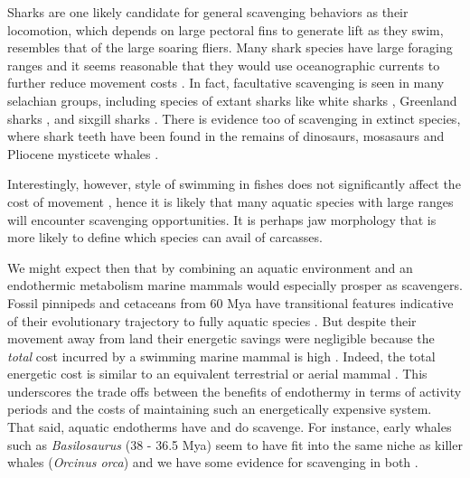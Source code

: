 \documentclass[a4paper,12pt]{article}
\begin{document}
Sharks are one likely candidate for general scavenging behaviors as their locomotion, which depends on large pectoral fins to generate lift as they swim, resembles that of the large soaring fliers.
Many shark species have large foraging ranges \citep[e.g. the great white sharks \textit{Carcharodon carcharias};][]{bruce2006movements} and it seems reasonable that they would use oceanographic currents to further reduce movement costs \citep{ruxton2004energetic}.
In fact, facultative scavenging is seen in many selachian groups, including species of extant sharks like white sharks \citep[known to feed on whale carcasses;][]{fallows2013white}, Greenland sharks \citep[feeding on seals;][]{watanabe2012slowest}, and sixgill sharks \citep{anderson2016impact}. 
There is evidence too of scavenging in extinct species, where shark teeth have been found in the remains of dinosaurs, mosasaurs and Pliocene mysticete whales \citep[5.3 - 3.6 Mya; ][]{schwimmer1997scavenging,ehret2009caught}. 

Interestingly, however, style of swimming in fishes does not significantly affect the cost of movement \citep{williams1999evolution}, hence it is likely that many aquatic species with large ranges will encounter scavenging opportunities. 
It is perhaps jaw morphology that is more likely to define which species can avail of carcasses.

We might expect then that by combining an aquatic environment and an endothermic metabolism marine mammals would especially prosper as scavengers. 
Fossil pinnipeds and cetaceans from 60 Mya have transitional features indicative of their evolutionary trajectory to fully aquatic species \citep{williams1999evolution}.  
But despite their movement away from land their energetic savings were negligible because the \textit{total} cost incurred by a swimming marine mammal is high \citep{williams1999evolution}. 
Indeed, the total energetic cost is similar to an equivalent terrestrial or aerial mammal \citep{williams1999evolution}.
This underscores the trade offs between the benefits of endothermy in terms of activity periods and the costs of maintaining such an energetically expensive system. 
That said, aquatic endotherms have and do scavenge. 
For instance, early whales such as \textit{Basilosaurus} (38 - 36.5 Mya) seem to have fit into the same niche as killer whales (\textit{Orcinus orca}) and we have some evidence for scavenging in both \citep{fahlke2012bite,Whitehead415}.
\end{document}
